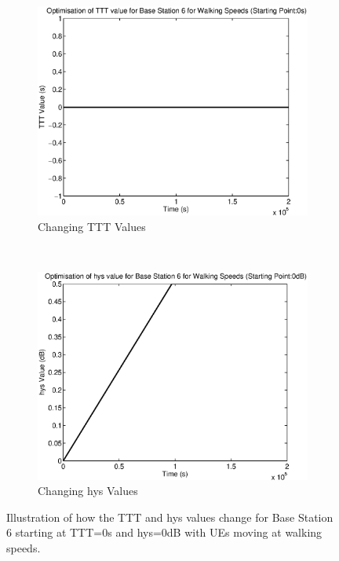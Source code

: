 \begin{figure}[H]
        \centering
        \begin{subfigure}[b]{0.49\textwidth}
                \includegraphics[width=\textwidth]{figures/graphs/walklow/TTT6.eps}
                \caption{Changing TTT Values}
        \end{subfigure}%
        ~ %
        \begin{subfigure}[b]{0.49\textwidth}
                \includegraphics[width=\textwidth]{figures/graphs/walklow/hys6.eps}
                \caption{Changing hys Values}
        \end{subfigure}
        \caption{Illustration of how the TTT and hys values change for Base Station 6 starting at TTT=0s and hys=0dB with UEs moving at walking speeds.}
\end{figure}
